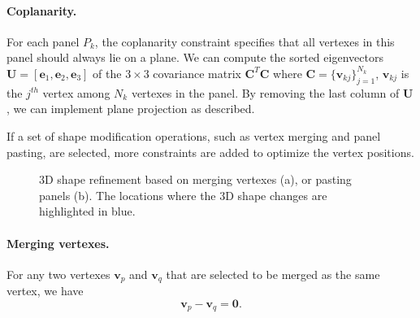 \paragraph{Coplanarity.} {For each panel $P_{k}$, the coplanarity constraint specifies that all vertexes in this panel should always lie on a plane. 
We can compute the sorted eigenvectors $\mathbf{U} = [\mathbf{e}_1, \mathbf{e}_2, \mathbf{e}_3]$ of the $ 3 \times 3$ covariance matrix $\mathbf{C}^T\mathbf{C}$ where $\mathbf{C} = \{\mathbf{v}_{kj}\}_{j=1}^{N_k}$, $\mathbf{v}_{kj}$ is the $j^{th}$ vertex among $N_k$ vertexes in the panel. By removing the last column of $\mathbf{U}$, we can implement plane projection as \cite{Bouaziz:2012:SSD:2346796.2346802} described.


If a set of shape modification operations, such as vertex merging and panel pasting, are selected, more constraints are added to optimize the vertex positions. 
%

\begin{figure}
	\centering
	\hfill
	\caption{3D shape refinement based on merging vertexes (a), or pasting panels (b). The locations where the 3D shape changes are highlighted in blue.  }
	\label{fig:shaperefinement}
\end{figure}

\paragraph{Merging vertexes.} 
For any two vertexes $\mathbf{v}_p$ and $\mathbf{v}_q$ that are selected to be merged as the same vertex, we have 
\begin{equation}
\mathbf{v}_p - \mathbf{v}_q = \mathbf{0}.
\label{equ:point}
\end{equation}

}
